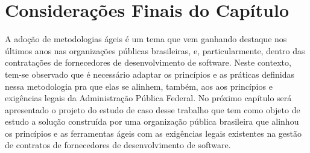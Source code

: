 \section[Considerações Finais do Capítulo]{Considerações Finais do Capítulo}

A adoção de metodologias ágeis é um tema que vem ganhando destaque nos últimos
anos nas organizações públicas brasileiras, e, particularmente, dentro das contratações de fornecedores de desenvolvimento de software. Neste contexto, tem-se observado que é necessário
adaptar os princípios e as práticas definidas nessa metodologia pra que elas se alinhem, também, aos
aos princípios e exigências legais da Administração Pública Federal. No próximo capítulo será apresentado o projeto do estudo de caso desse trabalho que tem como objeto de estudo a solução construída por uma organização pública brasileira que alinhou os princípios e as ferramentas ágeis com as exigências legais existentes na gestão de contratos de fornecedores de desenvolvimento de software.